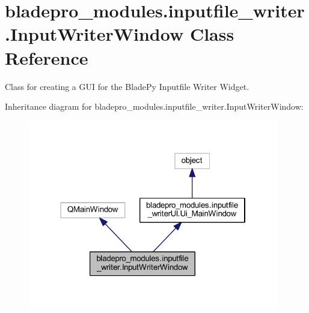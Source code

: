 \hypertarget{classbladepro__modules_1_1inputfile__writer_1_1_input_writer_window}{}\section{bladepro\+\_\+modules.\+inputfile\+\_\+writer.\+Input\+Writer\+Window Class Reference}
\label{classbladepro__modules_1_1inputfile__writer_1_1_input_writer_window}


Class for creating a G\+UI for the Blade\+Py Inputfile Writer Widget.  




Inheritance diagram for bladepro\+\_\+modules.\+inputfile\+\_\+writer.\+Input\+Writer\+Window\+:\nopagebreak
\begin{figure}[H]
\begin{center}
\leavevmode
\includegraphics[width=310pt]{classbladepro__modules_1_1inputfile__writer_1_1_input_writer_window__inherit__graph}
\end{center}
\end{figure}
